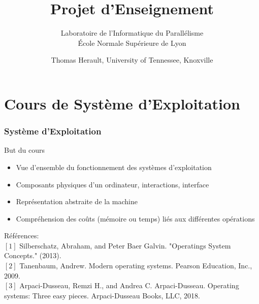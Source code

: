 \documentclass[compress,aspectratio=169]{beamer}
\title[Rencontre avec le Departement d'Informatique]{Projet d'Enseignement}
\subtitle{
  Laboratoire de l'Informatique du Parall\'elisme\\
  \'Ecole Normale Sup\'erieure de Lyon}
\author[herault@icl.utk.edu]{Thomas Herault, University of Tennessee, Knoxville}
\date[13 Mai 2024]{}
\begin{document}
\begin{frame}
  \titlepage
\end{frame}

\section{Cours de Syst\`eme d'Exploitation}

\begin{frame}
  \frametitle{Syst\`eme d'Exploitation}
  
  \begin{beamerboxesrounded}{But du cours}
    \begin{itemize}
    \item Vue d'ensemble du fonctionnement des syst\`emes d'exploitation
    \item Composants physiques d'un ordinateur, interactions, interface
    \item Repr\'esentation abstraite de la machine
    \item Compr\'ehension des co\^uts (m\'emoire ou temps) li\'es aux diff\'erentes op\'erations 
    \end{itemize}
  \end{beamerboxesrounded}
  
  \bigskip
  
  \small R\'ef\'erences:\\
  $[1]$ Silberschatz, Abraham, and Peter Baer Galvin. "Operatings System Concepts." (2013).\\
  $[2]$ Tanenbaum, Andrew. Modern operating systems. Pearson Education, Inc., 2009.\\
  $[3]$ Arpaci-Dusseau, Remzi H., and Andrea C. Arpaci-Dusseau. Operating systems: Three easy pieces. Arpaci-Dusseau Books, LLC, 2018.
  
\end{frame}
\end{document}
